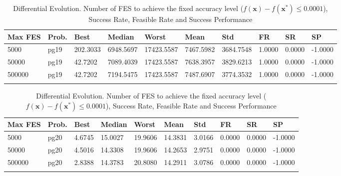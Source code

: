 \documentclass[10pt, a4paper]{book}
\begin{document}
\begin{center}
\begin{longtable}{l l l l l l l l l l}
\textbf{Max FES} & \textbf{Prob.} & \textbf{Best} & \textbf{Median} & \textbf{Worst} & \textbf{Mean} & \textbf{Std} & \textbf{FR} & \textbf{SR} & \textbf{SP} \\
\hline
5000 & pg19 & 202.3033 & 6948.5697 & 17423.5587 & 7467.5982 & 3684.7548 & 1.0000 & 0.0000 & -1.0000 \\
50000 & pg19 & 42.7202 & 7089.4039 & 17423.5587 & 7638.3957 & 3829.6213 & 1.0000 & 0.0000 & -1.0000 \\
500000 & pg19 & 42.7202 & 7194.5475 & 17423.5587 & 7487.6907 & 3774.3532 & 1.0000 & 0.0000 & -1.0000 \\

\caption{ Differential Evolution. Number of FES to achieve the fixed accuracy level ($f(\mathbf{x}) - f(\mathbf{x}^{*}) \leq 0.0001$), Success Rate, Feasible Rate and Success Performance }
\end{longtable}
\end{center}

\begin{center}
\begin{longtable}{l l l l l l l l l l}
\textbf{Max FES} & \textbf{Prob.} & \textbf{Best} & \textbf{Median} & \textbf{Worst} & \textbf{Mean} & \textbf{Std} & \textbf{FR} & \textbf{SR} & \textbf{SP} \\
\hline
5000 & pg20 & 4.6745 & 15.0027 & 19.9606 & 14.3831 & 3.0166 & 0.0000 & 0.0000 & -1.0000 \\
50000 & pg20 & 4.5016 & 14.3308 & 19.9606 & 14.2653 & 2.9751 & 0.0000 & 0.0000 & -1.0000 \\
500000 & pg20 & 2.8388 & 14.3783 & 20.8080 & 14.2911 & 3.0786 & 0.0000 & 0.0000 & -1.0000 \\

\caption{ Differential Evolution. Number of FES to achieve the fixed accuracy level ($f(\mathbf{x}) - f(\mathbf{x}^{*}) \leq 0.0001$), Success Rate, Feasible Rate and Success Performance }
\end{longtable}
\end{center}
\end{document}
